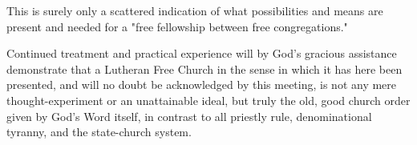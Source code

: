 This is surely only a scattered indication of what possibilities and means are present and needed for a "free fellowship between free congregations."

Continued treatment and practical experience will by God's gracious assistance demonstrate that a Lutheran Free Church in the sense in which it has here been presented, and will no doubt be acknowledged by this meeting, is not any mere thought-experiment or an unattainable ideal, but truly the old, good church order given by God's Word itself, in contrast to all priestly rule, denominational tyranny, and the state-church system.


